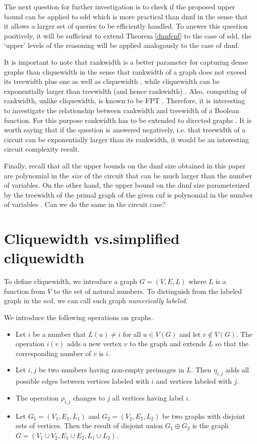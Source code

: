 \documentclass{llncs}
\begin{document}
The next question for further investigation is to check if the proposed upper bound can be applied to {\sc sdd} \cite{SDD} which is more 
practical than {\sc dnnf} in the sense that it allows a larger set of queries to be efficiently handled. To answer this question
positively, it will be sufficient to extend Theorem \ref{dnnfcnf} to the case of {\sc sdd}, the `upper' levels of the reasoning will
be applied analogously to the case of {\sc dnnf}. 

It is important to note that rankwidth is a better parameter for capturing dense graphs than cliquewidth
in the sense that rankwidth of a graph does not exceed its treewidth plus one \cite{RWDvsTWD} as well as cliquewidth \cite{CWDApprox}, 
while cliquewidth can be exponentially larger than treewidth (and hence rankwidth) \cite{CorRo}.
Also, computing of rankwidth, unlike cliquewidth, is known to be FPT \cite{RWDCompute}. Therefore, it is interesting to 
investigate the relationship between rankwidth and treewidth of a Boolean function. For this purpose rankwidth has to be extended
to directed graphs \cite{DirRWD}. It is worth saying that if the question is answered negatively, i.e. that treewidth
of a circuit can be exponentially larger than its rankwidth, it would be an interesting circuit complexity result.

Finally, recall that all the upper bounds on the {\sc dnnf} size obtained in this paper are polynomial in the \emph{size} of the circuit
that can be much larger than the number of variables. On the other hand, the upper bound on the {\sc dnnf} size 
parameterized by the treewidth of the primal graph of the given {\sc cnf} is polynomial in the number of variables \cite{DarwicheJACM}. 
Can we do the same in the circuit case? 


\appendix
\section{Cliquewidth vs.simplified cliquewidth}
To define cliquewidth, we introduce a graph $G=(V,E,L)$ where $L$ is a function
from $V$ to the set of natural numbers. 
To distinguish from the labeled graph in the {\sc scd}, we can call such graph
\emph{numerically labeled}.

We introduce the following operations on graphs.
\begin{itemize}
\item Let $i$ be a number that  $L(u) \neq i$ for all $u \in V(G)$
and let $v \notin V(G)$. The operation $i(v)$ adds a new vertex $v$ to the graph 
and extends $L$ so that the corresponding number of $v$ is $i$. 
\item Let $i,j$ be two numbers having non-empty preimages in $L$.
Then $\eta_{i,j}$ adds all possible edges between vertices labeled with $i$
and vertices labeled with $j$.
\item The operation $\rho_{i,j}$ changes to $j$ all vertices having label $i$.
\item Let $G_1=(V_1,E_1,L_1)$ and $G_2=(V_2,E_2,L_2)$ be two graphs with disjoint
sets of vertices. Then the result of disjoint union $G_1 \oplus G_2$ is the
graph $G=(V_1 \cup V_2, E_1 \cup E_2,L_1 \cup L_2)$.
\end{itemize}
\end{document}
